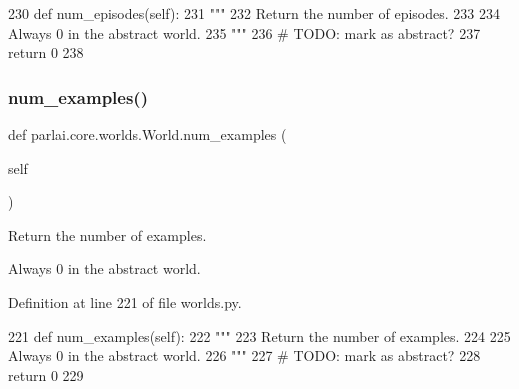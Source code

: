 \begin{DoxyCode}
230     \textcolor{keyword}{def }num\_episodes(self):
231         \textcolor{stringliteral}{"""}
232 \textcolor{stringliteral}{        Return the number of episodes.}
233 \textcolor{stringliteral}{}
234 \textcolor{stringliteral}{        Always 0 in the abstract world.}
235 \textcolor{stringliteral}{        """}
236         \textcolor{comment}{# TODO: mark as abstract?}
237         \textcolor{keywordflow}{return} 0
238 
\end{DoxyCode}
\mbox{\label{classparlai_1_1core_1_1worlds_1_1World_a0402b615564d760fac542b8c5a504be5}} 
\subsubsection{\texorpdfstring{num\+\_\+examples()}{num\_examples()}}
{\footnotesize\ttfamily def parlai.\+core.\+worlds.\+World.\+num\+\_\+examples (\begin{DoxyParamCaption}\item[{}]{self }\end{DoxyParamCaption})}

\begin{DoxyVerb}Return the number of examples.

Always 0 in the abstract world.
\end{DoxyVerb}
 

Definition at line 221 of file worlds.\+py.


\begin{DoxyCode}
221     \textcolor{keyword}{def }num\_examples(self):
222         \textcolor{stringliteral}{"""}
223 \textcolor{stringliteral}{        Return the number of examples.}
224 \textcolor{stringliteral}{}
225 \textcolor{stringliteral}{        Always 0 in the abstract world.}
226 \textcolor{stringliteral}{        """}
227         \textcolor{comment}{# TODO: mark as abstract?}
228         \textcolor{keywordflow}{return} 0
229 
\end{DoxyCode}
\mbox{\label{classparlai_1_1core_1_1worlds_1_1World_ac7e23e08adad68116e72162cd419786b}} 
